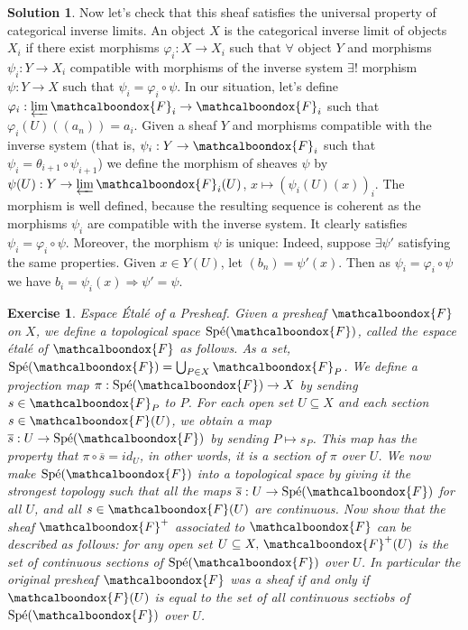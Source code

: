 \documentclass[12pt]{article}
\newcommand{\imp}{\ensuremath{\Rightarrow}}
\newcommand{\spe}{\ensuremath{\mathrm{Sp\acute{e}}}}
\newtheorem{ex}{Exercise}[section]
\theoremstyle{definition}
\newtheorem*{sol}{Solution}
\newcommand{\sF}{\ensuremath{\mathcalboondox{F}}}
\begin{document}
\begin{sol}
	Now let's check that this sheaf satisfies the universal property of categorical inverse limits. An object $X$ is the categorical inverse limit of objects $X_i$ if there exist morphisms $\varphi_i: X \to X_i$ such that $\forall$ object $Y$ and morphisms $\psi_i: Y \to X_i$ compatible with morphisms of the inverse system $\exists !$ morphism $\psi: Y \to X$ such that $\psi_i = \varphi_i \circ \psi$. In our situation, let's define $\varphi_i: \varprojlim \sF_i \to \sF_i$ such that $\varphi_i(U)((a_n)) = a_i$. Given a sheaf $Y$ and morphisms compatible with the inverse system (that is, $\psi_i: Y \to \sF_i$ such that $\psi_i = \theta_{i+1} \circ \psi_{i+1}$) we define the morphism of sheaves $\psi$ by $\psi(U): Y \to \varprojlim \sF_i(U)$, $x \mapsto (\psi_i(U)(x))_i$. The morphism is well defined, because the resulting sequence is coherent as the morphisms $\psi_i$ are compatible with the inverse system. It clearly satisfies $\psi_i = \varphi_i \circ \psi$. Moreover, the morphism $\psi$ is unique: Indeed, suppose $\exists \psi'$ satisfying the same properties. Given $x \in Y(U)$, let $(b_n) = \psi'(x)$. Then as $\psi_i = \varphi_i \circ \psi$ we have $b_i = \psi_i(x) \imp \psi' = \psi$. 
\end{sol}

\begin{ex}
	Espace Étalé of a Presheaf. Given a presheaf $\sF$ on $X$, we define a topological space $\text{Spé}(\sF)$, called the espace étalé of $\sF$ as follows. As a set, $\spe(\sF) = \bigcup_{P \in X} \sF_P$. We define a projection map $\pi: \spe(\sF) \to X$ by sending $s \in \sF_P$ to $P$. For each open set $U \subseteq X$ and each section $s \in \sF(U)$, we obtain a map $\overline{s}: U \to \spe(\sF)$ by sending $P \mapsto s_P$. This map has the property that $\pi \circ \overline{s} = id_U$, in other words, it is a section of $\pi$ over $U$. We now make $\spe(\sF)$ into a topological space by giving it the strongest topology such that all the maps $\overline{s}: U \to \spe(\sF)$ for all $U$, and all $s \in \sF(U)$ are continuous. Now show that the sheaf $\sF^+$ associated to $\sF$ can be described as follows: for any open set $U \subseteq X, \, \sF^+(U)$ is the set of continuous sections of $\spe(\sF)$ over $U$. In particular the original presheaf $\sF$ was a sheaf if and only if $\sF(U)$ is equal to the set of all continuous sectiobs of $\spe(\sF)$ over $U$.
\end{ex}
\end{document}
